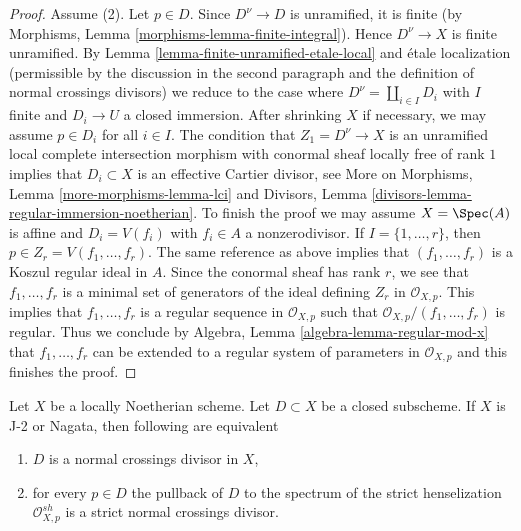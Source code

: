 \begin{proof}
\medskip\noindent
Assume (2). Let $p \in D$. Since $D^\nu \to D$ is unramified, it is
finite (by Morphisms, Lemma \ref{morphisms-lemma-finite-integral}).
Hence $D^\nu \to X$ is finite unramified.
By Lemma \ref{lemma-finite-unramified-etale-local}
and \'etale localization (permissible by the discussion
in the second paragraph and the definition of normal
crossings divisors) we reduce to the case where
$D^\nu = \coprod_{i \in I} D_i$
with $I$ finite and $D_i \to U$ a closed immersion.
After shrinking $X$ if necessary, we may assume
$p \in D_i$ for all $i \in I$. The condition that $Z_1 =  D^\nu \to X$ is an
unramified local complete intersection morphism
with conormal sheaf locally free of rank $1$
implies that $D_i \subset X$ is an effective Cartier divisor, see
More on Morphisms, Lemma \ref{more-morphisms-lemma-lci} and
Divisors, Lemma \ref{divisors-lemma-regular-immersion-noetherian}.
To finish the proof we may assume $X = \Spec(A)$ is affine
and $D_i = V(f_i)$ with $f_i \in A$ a nonzerodivisor.
If $I = \{1, \ldots, r\}$, then $p \in Z_r = V(f_1, \ldots, f_r)$.
The same reference as above implies that
$(f_1, \ldots, f_r)$ is a Koszul regular ideal in $A$.
Since the conormal sheaf has rank $r$, we see that
$f_1, \ldots, f_r$ is a minimal set of generators of
the ideal defining $Z_r$ in $\mathcal{O}_{X, p}$.
This implies that $f_1, \ldots, f_r$ is a regular sequence
in $\mathcal{O}_{X, p}$ such that $\mathcal{O}_{X, p}/(f_1, \ldots, f_r)$
is regular. Thus we conclude by
Algebra, Lemma \ref{algebra-lemma-regular-mod-x}
that $f_1, \ldots, f_r$ can be extended to a regular system of parameters
in $\mathcal{O}_{X, p}$ and this finishes the proof.
\end{proof}

\begin{lemma}
\label{lemma-characterize-normal-crossings}
Let $X$ be a locally Noetherian scheme. Let $D \subset X$ be a closed
subscheme. If $X$ is J-2 or Nagata, then following are equivalent
\begin{enumerate}
\item $D$ is a normal crossings divisor in $X$,
\item for every $p \in D$ the pullback of $D$ to the spectrum of the
strict henselization $\mathcal{O}_{X, p}^{sh}$
is a strict normal crossings divisor.
\end{enumerate}
\end{lemma}

